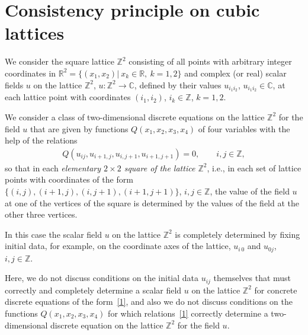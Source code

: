 \section{Consistency principle on cubic lattices}


We consider the square lattice $\mathbb{Z}^2$ consisting of all points
with arbitrary integer coordinates in $\mathbb{R}^2 = \{ (x_1, x_2)| \ x_k \in
\mathbb{R},\ k =1, 2 \}$ and complex (or real) scalar f\/ields $u$ on
the lattice $\mathbb{Z}^2$, $u : \mathbb{Z}^2 \rightarrow
\mathbb{C}$, def\/ined by their values $u_{i_1 i_2}$, $u_{i_1 i_2} \in
\mathbb{C}$, at each lattice point with coordinates $(i_1, i_2)$,
$i_k \in \mathbb{Z}$, $k = 1, 2$.




We consider a class of two-dimensional discrete equations on the
lattice $\mathbb{Z}^2$ for the f\/ield $u$ that are given by functions
$Q (x_1, x_2, x_3, x_4)$ of four variables with the help of the
relations
\begin{gather} Q (u_{i j}, u_{i + 1, j}, u_{i, j + 1}, u_{i + 1, j +
1}) = 0, \qquad i, j \in \mathbb{Z}, \label{1}
\end{gather}
so that in each
{\it elementary $2 \times 2$ square of the lattice $\mathbb{Z}^2$},
i.e., in each set of lattice points with coordinates of the form
$\{(i, j), (i + 1, j), (i, j + 1), (i + 1, j + 1)\}$, $i, j \in
\mathbb{Z}$, the value of the f\/ield $u$ at one of the vertices of
the square is determined by the values of the f\/ield at the other
three vertices.




In this case the scalar f\/ield $u$ on the lattice $\mathbb{Z}^2$ is
completely determined by f\/ixing initial data, for example, on the
coordinate axes of the lattice, $u_{i \, 0}$ and $u_{ 0 j}$, $i, j
\in \mathbb{Z}$.







Here, we do not discuss conditions on the initial data $u_{i j}$
themselves that must correctly and completely determine a scalar
f\/ield $u$ on the lattice $\mathbb{Z}^2$ for concrete discrete
equations of the form~\eqref{1}, and also we do not discuss
conditions on the functions $Q (x_1, x_2, x_3, x_4)$ for which
relations~\eqref{1} correctly determine a two-dimensional discrete
equation on the lattice $\mathbb{Z}^2$ for the f\/ield $u$.






